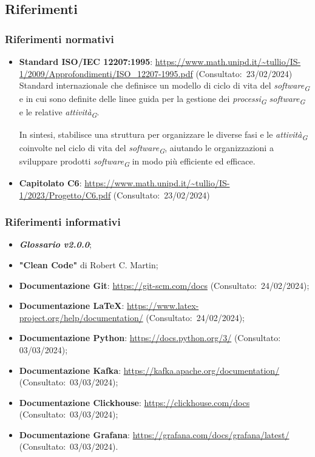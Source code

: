 \subsection{Riferimenti}
\subsubsection{Riferimenti normativi}
\begin{itemize}
    \item \textbf{Standard ISO/IEC 12207:1995}: \url{https://www.math.unipd.it/~tullio/IS-1/2009/Approfondimenti/ISO_12207-1995.pdf} (Consultato:~23/02/2024) \\
    Standard internazionale che definisce un modello di ciclo di vita del \textit{software}\textsubscript{\textit{G}} e in cui sono definite delle linee guida per la gestione dei \textit{processi}\textsubscript{\textit{G}} \textit{software}\textsubscript{\textit{G}} e le relative \textit{attività}\textsubscript{\textit{G}}.
    
    In sintesi, stabilisce una struttura per organizzare le diverse fasi e le \textit{attività}\textsubscript{\textit{G}} coinvolte nel ciclo di vita del \textit{software}\textsubscript{\textit{G}}, aiutando le organizzazioni a sviluppare prodotti \textit{software}\textsubscript{\textit{G}} in modo più efficiente ed efficace.

    \item \textbf{Capitolato C6}: \url{https://www.math.unipd.it/~tullio/IS-1/2023/Progetto/C6.pdf} (Consultato:~23/02/2024)

\end{itemize}

\subsubsection{Riferimenti informativi}
\begin{itemize}
    \item \textbf{\textit{Glossario v2.0.0}};
    \item \textbf{"Clean Code"} di Robert C. Martin;
    \item \textbf{Documentazione Git}: \url{https://git-scm.com/docs} (Consultato:~24/02/2024);
    \item \textbf{Documentazione \LaTeX}: \url{https://www.latex-project.org/help/documentation/} (Consultato:~24/02/2024);
    \item \textbf{Documentazione Python}: \url{https://docs.python.org/3/} (Consultato: 03/03/2024);
    \item \textbf{Documentazione Kafka}: \url{https://kafka.apache.org/documentation/} (Consultato:~03/03/2024);
    \item \textbf{Documentazione Clickhouse}: \url{https://clickhouse.com/docs} (Consultato:~03/03/2024);
    \item \textbf{Documentazione Grafana}: \url{https://grafana.com/docs/grafana/latest/} (Consultato:~03/03/2024).
\end{itemize}
